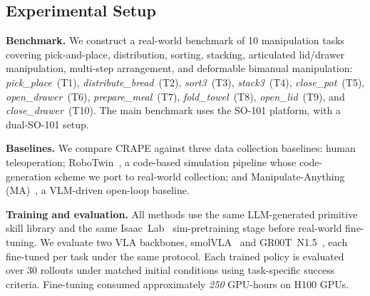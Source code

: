 \documentclass{article}
\begin{document}
\subsection{Experimental Setup}
\label{sec:setup}

\textbf{Benchmark.}
We construct a real-world benchmark of 10 manipulation tasks covering pick-and-place, distribution, sorting, stacking, articulated lid/drawer manipulation, multi-step arrangement, and deformable bimanual manipulation: 
\textit{pick\_place}~(T1), \textit{distribute\_bread}~(T2), \textit{sort3}~(T3), \textit{stack3}~(T4), \textit{close\_pot}~(T5), \textit{open\_drawer}~(T6), \textit{prepare\_meal}~(T7), \textit{fold\_towel}~(T8), \textit{open\_lid}~(T9), and \textit{close\_drawer}~(T10). 
The main benchmark uses the SO-101 platform, with a dual-SO-101 setup.

\textbf{Baselines.}
We compare CRAPE against three data collection baselines: human teleoperation; RoboTwin~\citep{chen2025robotwin}, a code-based simulation pipeline whose code-generation scheme we port to real-world collection; and Manipulate-Anything (MA)~\citep{duan2024manipulate}, a VLM-driven open-loop baseline.

\textbf{Training and evaluation.}
All methods use the same LLM-generated primitive skill library and the same Isaac~Lab~\citep{mittal2025isaac} sim-pretraining stage before real-world fine-tuning. 
We evaluate two VLA backbones, smolVLA~\citep{shukor2025smolvla} and GR00T~N1.5~\citep{bjorck2025gr00t,nvidiagear2025gr00tn15}, each fine-tuned per task under the same protocol. 
Each trained policy is evaluated over 30 rollouts under matched initial conditions using task-specific success criteria. 
Fine-tuning consumed approximately \textit{250} GPU-hours on H100 GPUs.
\end{document}
